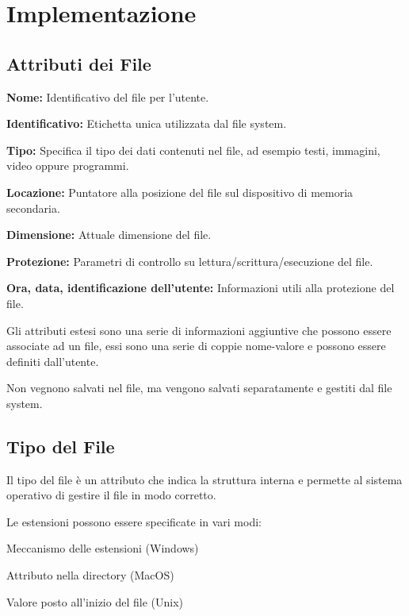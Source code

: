 \section{Implementazione}

\subsection{Attributi dei File}
\begin{sitemize}
    \item \textbf{Nome:} Identificativo del file per l'utente.
    \item \textbf{Identificativo:} Etichetta unica utilizzata dal file system.
    \item \textbf{Tipo:} Specifica il tipo dei dati contenuti nel file, ad esempio testi, immagini, video oppure programmi.
    \item \textbf{Locazione:} Puntatore alla posizione del file sul dispositivo di memoria secondaria.
    \item \textbf{Dimensione:} Attuale dimensione del file.
    \item \textbf{Protezione:} Parametri di controllo su lettura/scrittura/esecuzione del file.
    \item \textbf{Ora, data, identificazione dell'utente:} Informazioni utili alla protezione del file.
\end{sitemize}

\begin{note}
    Gli attributi estesi sono una serie di informazioni aggiuntive che possono essere associate ad un file, essi sono una serie di coppie nome-valore e possono essere definiti dall'utente.

    Non vegnono salvati nel file, ma vengono salvati separatamente e gestiti dal file system.
\end{note}

\subsection{Tipo del File}
Il tipo del file è un attributo che indica la struttura interna e permette al sistema operativo di gestire il file in modo corretto.

\spacer
Le estensioni possono essere specificate in vari modi:
\begin{sitemize}
    \item Meccanismo delle estensioni (Windows)
    \item Attributo nella directory (MacOS)
    \item Valore posto all'inizio del file (Unix)
\end{sitemize}

